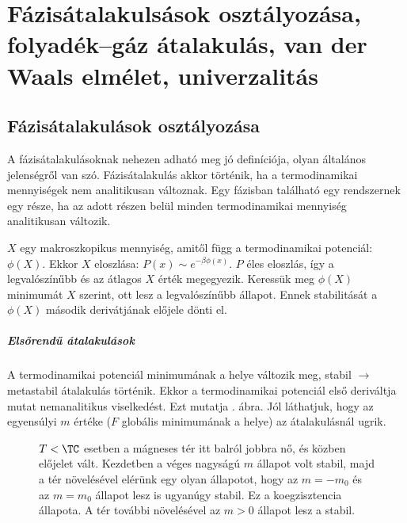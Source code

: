 \chapter{F\'azis\'atalakuls\'asok oszt\'alyoz\'asa, folyad\'ek--g\'az \'atalakul\'as, van der Waals elm\'elet, univerzalit\'as} 
 
 \section{Fázisátalakulások osztályozása}
  
  A fázisátalakulásoknak nehezen adható meg jó definíciója, olyan általános jelenségről van szó.
   Fázisátalakulás akkor történik, ha a termodinamikai mennyiségek nem analitikusan változnak.
   Egy fázisban található egy rendszernek egy része, ha az adott részen belül minden termodinamikai mennyiség analitikusan változik.
  
  $X$ egy makroszkopikus mennyiség, amitől függ a termodinamikai potenciál: $\phi(X)$.
   Ekkor $X$ eloszlása: $P(x)\sim e^{-\beta\phi(x)}$. $P$ éles eloszlás, így a legvalószínűbb és az átlagos $X$ érték megegyezik.
   Keressük meg $\phi(X)$ minimumát $X$ szerint, ott lesz a legvalószínűbb állapot.
   Ennek stabilitását a $\phi(X)$ második derivátjának előjele dönti el. 
  
  \paragraph{Elsőrendű átalakulások}
  
   A termodinamikai potenciál minimumának a helye változik meg, stabil $\rightarrow$ metastabil átalakulás történik.
   Ekkor a termodinamikai potenciál első deriváltja mutat nemanalitikus viselkedést.
   Ezt mutatja . ábra.
   Jól láthatjuk, hogy az egyensúlyi $m$ értéke ($F$ globális minimumának a helye) az átalakulásnál ugrik. 
   
   \begin{figure}[ht!]
    \centering
     \hspace{6pt}
     \hspace{6pt}
    \caption{
     $T<\TC$ esetben a mágneses tér itt balról jobbra nő, és közben előjelet vált.
   Kezdetben a véges nagyságú $m$ állapot volt stabil, majd a tér növelésével elérünk egy olyan állapotot, hogy az $m=-m_0$ és az $m=m_0$ állapot lesz is ugyanúgy stabil.
   Ez a koegzisztencia állapota.
   A tér további növelésével az $m>0$ állapot lesz a stabil. 
    }\label{fig:B09-elsorend}
   \end{figure}
   
